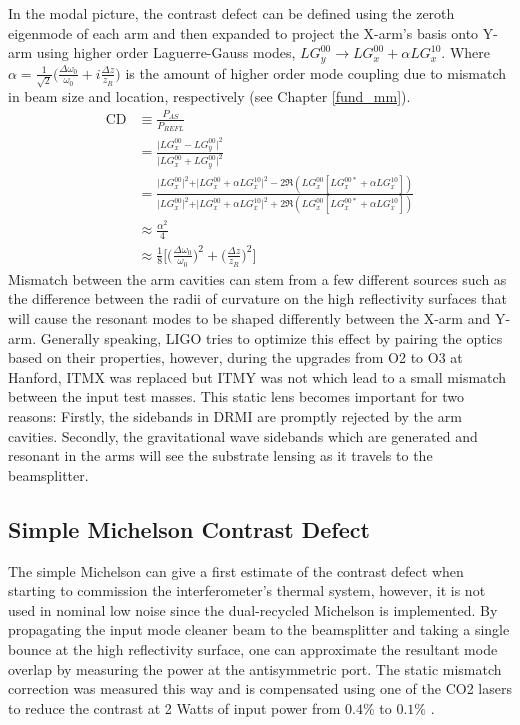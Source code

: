 	In the modal picture, the contrast defect can be defined using the zeroth eigenmode of each arm and then expanded to project the X-arm's basis onto Y-arm using higher order Laguerre-Gauss modes, $LG^{00}_y \rightarrow  LG^{00}_x + \alpha LG^{10}_x$. Where $\alpha = \frac{1}{\sqrt{2}} \big(\frac{\Delta \omega_{0}}{\omega_{0}} + i \frac{\Delta z }{z_R}\big)$ is the amount of higher order mode coupling due to mismatch in beam size and location, respectively (see Chapter \ref{fund_mm}).
	\begin{equation}\label{CD_mode}
	\begin{aligned}
	\text{CD} 	&\equiv \frac{P_{AS}}{P_{REFL}} \\
				&= \frac{\vert LG^{00}_x - LG^{00}_y \vert^2}{\vert LG^{00}_x + LG^{00}_y \vert^2}\\
				&= \frac{\vert LG^{00}_x \vert^2 + \vert LG^{00}_x + \alpha LG^{10}_x \vert^2 - 2\Re(LG^{00}_x [LG^{00*}_x + \alpha LG^{10}_x ])}{\vert LG^{00}_x \vert^2 + \vert LG^{00}_x + \alpha LG^{10}_x \vert^2 + 2\Re(LG^{00}_x [LG^{00*}_x + \alpha LG^{10}_x ])}\\
				&\approx \frac{\alpha^2}{4}\\
				&\approx \frac{1}{8} \bigg[ \bigg(\frac{\Delta\omega_{0}}{\omega_{0}} \bigg)^2+  \bigg(\frac{ \Delta z }{z_R}\bigg)^2 \bigg]
	\end{aligned}
	\end{equation}
	Mismatch between the arm cavities can stem from a few different sources such as the difference between the radii of curvature on the high reflectivity surfaces that will cause the resonant modes to be shaped differently between the X-arm and Y-arm.  Generally speaking, LIGO tries to optimize this effect by pairing the optics based on their properties, however, during the upgrades from O2 to O3 at Hanford, ITMX was replaced but ITMY was not which lead to a small mismatch between the input test masses. This static lens becomes important for two reasons: Firstly, the sidebands in DRMI are promptly rejected by the arm cavities. Secondly, the gravitational wave sidebands which are generated and resonant in the arms will see the substrate lensing as it travels to the beamsplitter.
	
	\subsection{Simple Michelson Contrast Defect}
	The simple Michelson can give a first estimate of the contrast defect when starting to commission the interferometer's thermal system, however, it is not used in nominal low noise since the dual-recycled Michelson is implemented.  By propagating the input mode cleaner beam to the beamsplitter and taking a single bounce at the high reflectivity surface, one can approximate the resultant mode overlap by measuring the power at the antisymmetric port.  The static mismatch correction was measured this way and is compensated using one of the CO2 lasers to reduce the contrast at 2 Watts of input power from $0.4\%$ to $0.1\%$ \cite{CD_meas}.
	
